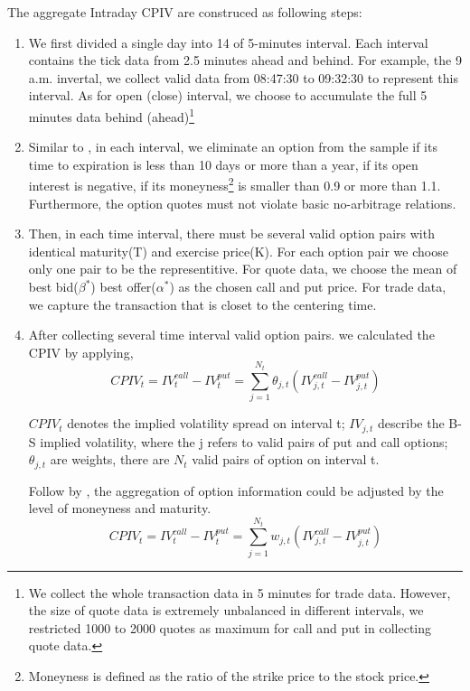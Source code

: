The aggregate Intraday CPIV are construced as following steps: 
\begin{enumerate}
\item  We first divided a single day into 14 of 5-minutes interval. Each interval contains the tick data from 2.5 minutes ahead and behind. For example, the 9 a.m. invertal, we collect valid data from 08:47:30 to 09:32:30 to represent this interval. As for open (close) interval, we choose to accumulate the full 5 minutes data behind (ahead)\footnote{We collect the whole transaction data in 5 minutes for trade data. However, the size of quote data is extremely unbalanced in different intervals, we restricted 1000 to 2000 quotes as maximum for call and put in collecting quote data.}

\item Similar to \textcite{xing2010does}, in each interval, we eliminate an option from the sample if its time to expiration is less than 10 days or more than a year, if its open interest is negative, if its moneyness\footnote{Moneyness is defined as the ratio of the strike price to the stock price.} is smaller than 0.9 or more than 1.1. Furthermore, the option quotes must not violate basic no-arbitrage relations.

\item Then, in each time interval, there must be several valid option pairs with identical maturity(T) and exercise price(K). For each option pair we choose only one pair to be the representitive. For quote data, we choose the mean of best bid($\beta ^{\ast }$) best offer($\alpha ^{\ast }$) as the chosen call and put price. For trade data, we capture the transaction that is closet to the centering time.  

\item After collecting several time interval valid option pairs. we calculated the CPIV by applying, 
 \begin{equation} \label{eq: withoutadj}
CPIV_{t} = IV_{t}^{call} - IV_{t}^{put} = \sum_{j = 1}^{N_{t}}\theta _{j,t}(IV_{j,t}^{call} - IV_{j,t}^{put})
 \end{equation}
 
$CPIV_{t}$ denotes the implied volatility spread on interval t; $IV_{j,t}$ describe the B-S implied volatility, where the j refers to valid pairs of put and call options; $\theta_{j,t}$ are weights, there are $N_{t}$ valid pairs of option on interval t. 

Follow by \textcite{holowczak2013aggregating}, the aggregation of option information could be adjusted by the level of moneyness and maturity. 
 \begin{equation} \label{eq: withadj}
CPIV_{t} = IV_{t}^{call} - IV_{t}^{put} = \sum_{j = 1}^{N_{t}}w_{j,t}(IV_{j,t}^{call} - IV_{j,t}^{put})
 \end{equation}


\end{enumerate}
